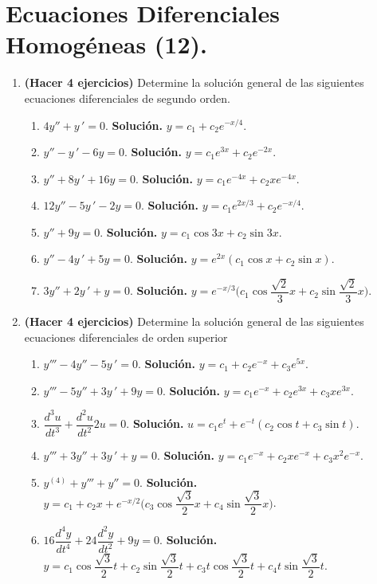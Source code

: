 \documentclass[letterpaper,10pt]{memoir}
\begin{document}
\titulo

\section*{Ecuaciones Diferenciales Homogéneas (12).} %
\begin{enumerate}
	\item \textbf{(Hacer 4 ejercicios)} Determine la solución general de las siguientes ecuaciones diferenciales de segundo orden.
		\begin{enumerate}
			\item \(4 y'' +y \,' =0\). \textbf{Solución.} \(y=c_1+c_2e^{-x/4}\).
			\item \(y'' -y \,' -6y=0\). \textbf{Solución.} \(y=c_1e^{3x} +c_2e^{-2x}\).
			\item \(y'' +8y \,' +16y=0\). \textbf{Solución.} \(y=c_1e^{-4x} +c_2xe^{-4x}\).
			\item \(12y '' -5y \,' -2y=0\). \textbf{Solución.} \(y=c_1e^{2x/3} +c_2e^{-x/4}\).
			\item \(y'' +9y=0\). \textbf{Solución.} \(y=c_1 \cos 3x+c_2 \sin 3x\).
			\item \(y'' -4y \,' +5y=0\). \textbf{Solución.} \(y=e^{2x} (c_1 \cos x+c_2 \sin x)\).
			\item \(3y'' +2y \,' +y=0\). \textbf{Solución.} \(y=e^{-x/3} \Bigg(c_1 \cos \dfrac{\sqrt{2}}{3} x+c_2 \sin \dfrac{\sqrt{2}}{3} x\Bigg)\).
		\end{enumerate}
	\item \textbf{(Hacer 4 ejercicios)} Determine la solución general de las siguientes ecuaciones diferenciales de orden superior
		\begin{enumerate}
			\item \(y''' -4y'' -5y \,' =0\). \textbf{Solución.} \(y=c_1+c_2e^{-x} +c_3e^{5x}\).
			\item \(y''' -5y'' +3y \,' +9y=0\). \textbf{Solución.} \(y=c_1e^{-x} +c_2e^{3x} +c_3xe^{3x}\).
			\item \(\dfrac{d^3u}{dt^3} + \dfrac{d^2u}{dt^2} 2u=0\). \textbf{Solución.} \(u=c_1e^t+e^{-t} (c_2 \cos t+c_3 \sin t)\).
			\item \(y''' +3y'' +3y \,' +y=0\). \textbf{Solución.} \(y=c_1e^{-x} +c_2xe^{-x} +c_3x^2e^{-x}\).
			\item \(y^{(4)} +y''' +y'' =0\). \textbf{Solución.} \(y=c_1+c_2x+e^{-x/2} \Big(c_3 \cos \dfrac{\sqrt{3}}{2} x+c_4 \sin \dfrac{\sqrt{3}}{2} x\Big)\).
			\item \(16 \dfrac{d^4y}{dt^4} +24 \dfrac{d^2 y}{dt^2} +9y=0\). \textbf{Solución.} \(y=c_1 \cos \dfrac{\sqrt{3}}{2} t+c_2 \sin \dfrac{\sqrt{3}}{2} t+c_3t \cos \dfrac{\sqrt{3}}{2} t+c_4 t \sin \dfrac{\sqrt{3}}{2} t\).

\end{enumerate}
\end{enumerate}
\end{document}
